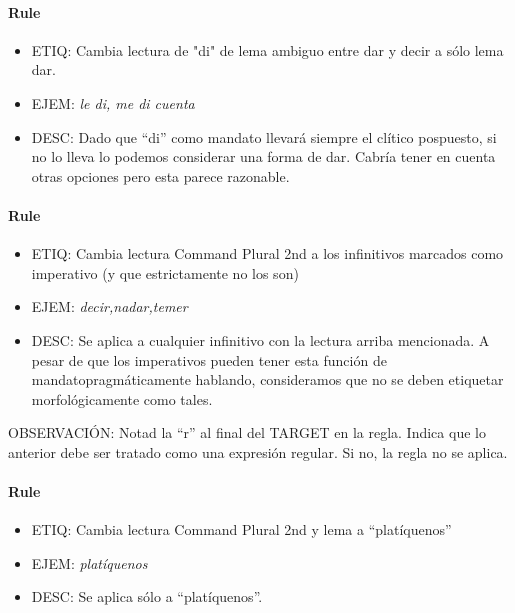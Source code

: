 \documentclass[11pt]{report}
\begin{document}
\paragraph*{Rule}
\begin{itemize}
\item ETIQ: Cambia lectura de "di" de lema ambiguo entre dar y decir a sólo lema dar.
\item EJEM: \emph{le di, me di cuenta} 
\item DESC: Dado que ``di'' como mandato llevará siempre el clítico pospuesto, si no lo lleva lo podemos considerar una forma de dar. Cabría tener en cuenta otras opciones pero esta parece razonable.
\end{itemize}

\paragraph*{Rule}
\begin{itemize}
\item ETIQ: Cambia lectura Command Plural 2nd a los infinitivos marcados como imperativo (y que estrictamente no los son)
\item EJEM: \emph{decir,nadar,temer} 
\item DESC: Se aplica a cualquier infinitivo con la lectura arriba mencionada. A pesar de que los imperativos pueden tener esta función de mandatopragmáticamente hablando, consideramos que no se deben etiquetar morfológicamente como tales.
\end{itemize}

OBSERVACIÓN: Notad la ``r'' al final del TARGET en la regla. Indica que lo anterior debe ser tratado como una expresión regular. Si no, la regla no se aplica.

\paragraph*{Rule}
\begin{itemize}
\item ETIQ: Cambia lectura Command Plural 2nd y lema a ``platíquenos'' 
\item EJEM: \emph{platíquenos} 
\item DESC: Se aplica sólo a ``platíquenos''.
\end{itemize}
\end{document}
